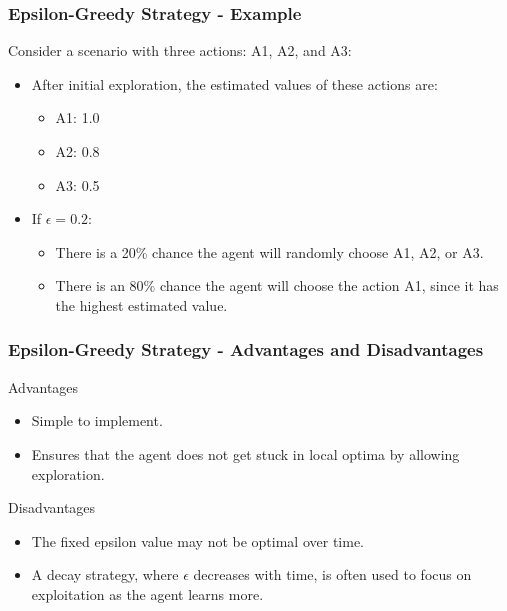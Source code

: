 \documentclass[aspectratio=169]{beamer}
\begin{document}
\begin{frame}[fragile]
    \frametitle{Epsilon-Greedy Strategy - Example}
    Consider a scenario with three actions: A1, A2, and A3:
    \begin{itemize}
        \item After initial exploration, the estimated values of these actions are:
        \begin{itemize}
            \item A1: 1.0
            \item A2: 0.8
            \item A3: 0.5
        \end{itemize}
        \item If \(\epsilon = 0.2\):
        \begin{itemize}
            \item There is a 20\% chance the agent will randomly choose A1, A2, or A3.
            \item There is an 80\% chance the agent will choose the action A1, since it has the highest estimated value.
        \end{itemize}
    \end{itemize}
\end{frame}

\begin{frame}[fragile]
    \frametitle{Epsilon-Greedy Strategy - Advantages and Disadvantages}
    \begin{block}{Advantages}
        \begin{itemize}
            \item Simple to implement.
            \item Ensures that the agent does not get stuck in local optima by allowing exploration.
        \end{itemize}
    \end{block}
    
    \begin{block}{Disadvantages}
        \begin{itemize}
            \item The fixed epsilon value may not be optimal over time.
            \item A decay strategy, where \(\epsilon\) decreases with time, is often used to focus on exploitation as the agent learns more.
        \end{itemize}
    \end{block}
\end{frame}
\end{document}
